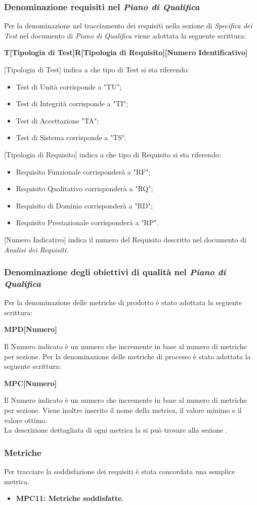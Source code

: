 \subsubsection{Denominazione requisiti nel \textit{Piano di Qualifica}}
Per la denominazione nel tracciamento dei requisiti nella sezione di \textit{Specifica dei Test} nel documento di \textit{Piano di Qualifica} viene adottata la seguente scrittura:
\begin{center}\textbf{T[Tipologia di Test]R[Tipologia di Requisito][Numero Identificativo]}\end{center}
[Tipologia di Test] indica a che tipo di Test si sta riferendo:
\begin{itemize}
\item Test di Unità corrisponde a "TU";
\item Test di Integrità corrisponde a "TI";
\item Test di Accettazione "TA";
\item Test di Sistema corrisponde a "TS".
\end{itemize}
[Tipologia di Requisito] indica a che tipo di Requisito si sta riferendo:
\begin{itemize}
\item Requisito Funzionale corrisponderà a "RF";
\item Requisito Qualitativo corrisponderà a "RQ";
\item Requisito di Dominio corrisponderà a "RD";
\item Requisito Prestazionale corrisponderà a "RP".
\end{itemize}
[Numero Indicativo] indica il numero del Requisito descritto nel documento di \textit{Analisi dei Requisiti}.

\subsubsection{Denominazione degli obiettivi di qualità nel \textit{Piano di Qualifica}}
Per la denominazione delle metriche di prodotto è stato adottata la seguente scrittura:
\begin{center}\textbf{MPD[Numero]}\end{center}
Il Numero indicato è un numero che incremente in base al numero di metriche per sezione.
Per la denominazione delle metriche di processo è stato adottata la seguente scrittura:
\begin{center}\textbf{MPC[Numero]}\end{center}
Il Numero indicato è un numero che incremente in base al numero di metriche per sezione.
Viene inoltre inserito il nome della metrica, il valore minimo e il valore ottimo.\\
La descrizione dettagliata di ogni metrica la si può trovare alla sezione .
\subsubsection{Metriche} 
Per tracciare la soddisfazione dei requisiti è stata concordata una semplice metrica.
\begin{itemize}
    \item \textbf{MPC11: Metriche soddisfatte}.
\end{itemize}
